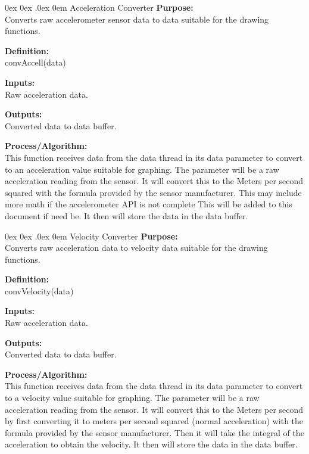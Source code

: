 \documentclass[10pt,draftclsnofoot,onecolumn,compsoc]{IEEEtran}
\makeatletter
\renewcommand\paragraph{\@startsection{paragraph}{4}{\z@}%
                                    {0ex \@plus0ex \@minus.0ex}%
                                    {0em}%
                                    {\normalfont\normalsize\bfseries}}
\makeatother
\begin{document}
\paragraph{Acceleration Converter}
{\bf Purpose:} \\
Converts raw accelerometer sensor data to data suitable for the drawing functions.  \par
{\bf Definition:} \\ 
convAccell(data) \par
{\bf Inputs:} \\ Raw acceleration data. \par
{\bf Outputs:} \\ Converted data to data buffer. \par
{\bf Process/Algorithm:} \\
This function receives data from the data thread in its data parameter to convert to an acceleration value suitable for graphing. The parameter will be a raw acceleration reading from the sensor. It will convert this to the Meters per second squared with the formula provided by the sensor manufacturer. This may include more math if the accelerometer API is not complete This will be added to this document if need be. It then will store the data in the data buffer. \par

\paragraph{Velocity Converter}
{\bf Purpose:} \\
Converts raw acceleration data to velocity data suitable for the drawing functions.  \par
{\bf Definition:} \\ 
convVelocity(data) \par
{\bf Inputs:} \\ Raw acceleration data. \par
{\bf Outputs:} \\ Converted data to data buffer. \par
{\bf Process/Algorithm:} \\
This function receives data from the data thread in its data parameter to convert to a velocity value suitable for graphing. The parameter will be a raw acceleration reading from the sensor. It will convert this to the Meters per second by first converting it to meters per second squared (normal acceleration) with the formula provided by the sensor manufacturer. Then it will take the integral of the acceleration to obtain the velocity.  It then will store the data in the data buffer. \par
\end{document}
